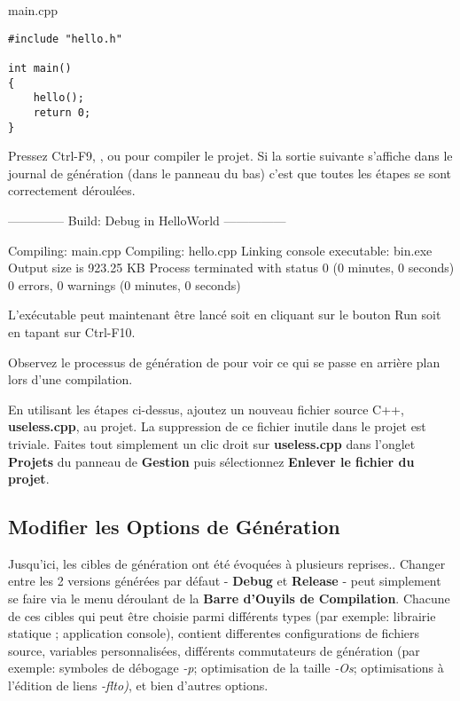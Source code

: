 main.cpp
\begin{lstlisting}
#include "hello.h"

int main()
{
    hello();
    return 0;
}
\end{lstlisting}

Pressez Ctrl-F9, , ou  pour compiler le projet. Si la sortie suivante s'affiche dans le journal de génération (dans le panneau du bas) c'est que toutes les étapes se sont correctement déroulées.

\begin{code}
-------------- Build: Debug in HelloWorld ---------------

Compiling: main.cpp
Compiling: hello.cpp
Linking console executable: bin\Debug\HelloWorld.exe
Output size is 923.25 KB
Process terminated with status 0 (0 minutes, 0 seconds)
0 errors, 0 warnings (0 minutes, 0 seconds)
\end{code}

L'exécutable peut maintenant être lancé soit en cliquant sur le bouton Run soit en tapant sur Ctrl-F10.


Observez le processus de génération de \codeblocks pour voir ce qui se passe en arrière plan lors d'une compilation.


En utilisant les étapes ci-dessus, ajoutez un nouveau fichier source C++, \textbf{useless.cpp}, au projet. La suppression de ce fichier inutile dans le projet est triviale. Faites tout simplement un clic droit sur \textbf{useless.cpp} dans l'onglet \textbf{Projets} du panneau de \textbf{Gestion} puis sélectionnez \textbf{Enlever le fichier du projet}.

 


\subsection{Modifier les Options de Génération}
 
Jusqu'ici, les cibles de génération ont été évoquées à plusieurs reprises.. Changer entre les 2 versions générées par défaut - \textbf{Debug} et \textbf{Release} - peut simplement se faire via le menu déroulant de la \textbf{Barre d'Ouyils de Compilation}. Chacune de ces cibles qui peut être choisie parmi différents types (par exemple: librairie statique ; application console), contient differentes configurations de fichiers source, variables personnalisées, différents commutateurs de génération (par exemple: symboles de débogage \textit{-p}; optimisation de la taille \textit{-Os}; optimisations à l'édition de liens \textit{-flto)}, et bien d'autres options.
 

